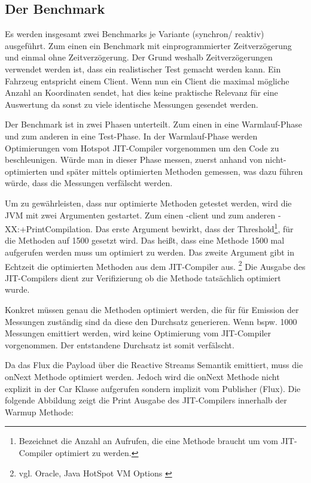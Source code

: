 \subsection{Der Benchmark}
\label{chap:benchmark}
Es werden insgesamt zwei Benchmarks je Variante (synchron/ reaktiv) ausgeführt. Zum einen ein Benchmark mit einprogrammierter Zeitverzögerung und einmal ohne Zeitverzögerung. Der Grund weshalb Zeitverzögerungen verwendet werden ist, dass ein realistischer Test gemacht werden kann. Ein Fahrzeug entspricht einem Client. Wenn nun ein Client die maximal mögliche Anzahl an Koordinaten sendet, hat dies keine praktische Relevanz für eine Auswertung da sonst zu viele identische Messungen gesendet werden.

Der Benchmark ist in zwei Phasen unterteilt. Zum einen in eine Warmlauf-Phase und zum anderen in eine Test-Phase. In der Warmlauf-Phase werden Optimierungen vom Hotspot JIT-Compiler vorgenommen um den Code zu beschleunigen. Würde man in dieser Phase messen, zuerst anhand von nicht-optimierten und später mittels optimierten Methoden gemessen, was dazu führen würde, dass die Messungen verfälscht werden. 

Um zu gewährleisten, dass nur optimierte Methoden getestet werden, wird die JVM mit zwei Argumenten gestartet. Zum einen -client und zum anderen 
-XX:+PrintCompilation. Das erste Argument bewirkt, dass der Threshold\footnote{Bezeichnet die Anzahl an Aufrufen, die eine Methode braucht um vom JIT-Compiler optimiert zu werden.}, für die Methoden auf 1500 gesetzt wird. Das heißt, dass eine Methode 1500 mal aufgerufen werden muss um optimiert zu werden. Das zweite Argument gibt in Echtzeit die optimierten Methoden aus dem JIT-Compiler aus. \footnote{vgl. Oracle, Java HotSpot VM Options \cite{web:site:oracle:jvmhotspot}} Die Ausgabe des JIT-Compilers dient zur Verifizierung ob die Methode tatsächlich optimiert wurde.

Konkret müssen genau die Methoden optimiert werden, die für für Emission der Messungen zuständig sind da diese den Durchsatz generieren. Wenn bspw. 1000 Messungen emittiert werden, wird keine Optimierung vom JIT-Compiler vorgenommen. Der entstandene Durchsatz ist somit verfälscht. 

Da das Flux die Payload über die Reactive Streams Semantik emittiert, muss die onNext Methode optimiert werden. Jedoch wird die onNext Methode nicht explizit in der Car Klasse aufgerufen sondern implizit vom Publisher (Flux). Die folgende Abbildung zeigt die Print Ausgabe des JIT-Compilers innerhalb der Warmup Methode:

